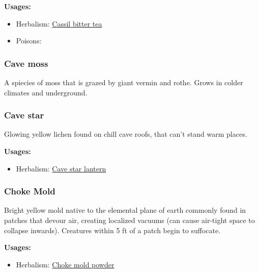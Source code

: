 \vspace{5mm}

\textbf{Usages:}

\begin{itemize}[noitemsep]
\item[] Herbalism: \hyperref[Cassil bitter tea]{Cassil bitter tea}
\item[] Poisons: \poison
\end{itemize}

\subsubsection{Cave moss}
\label{Cave moss}

A spiecies of moss that is grazed by giant vermin and rothe. Grows in colder climates and underground.

\subsubsection{Cave star}
\label{Cave star}

Glowing yellow lichen found on chill cave roofs, that can't stand warm places.

\vspace{5mm}

\textbf{Usages:}

\begin{itemize}[noitemsep]
\item[] Herbalism: \hyperref[Cave star lantern]{Cave star lantern}
\end{itemize}

\subsubsection{Choke Mold}
\label{Choke Mold}

Bright yellow mold native to the elemental plane of earth commonly found in patches that devour air, creating localized vacuums (can cause air-tight space to collapse inwards). Creatures within 5 ft of a patch begin to suffocate.

\vspace{5mm}

\textbf{Usages:}

\begin{itemize}[noitemsep]
\item[] Herbalism: \hyperref[Choke mold powder]{Choke mold powder}
\end{itemize}

